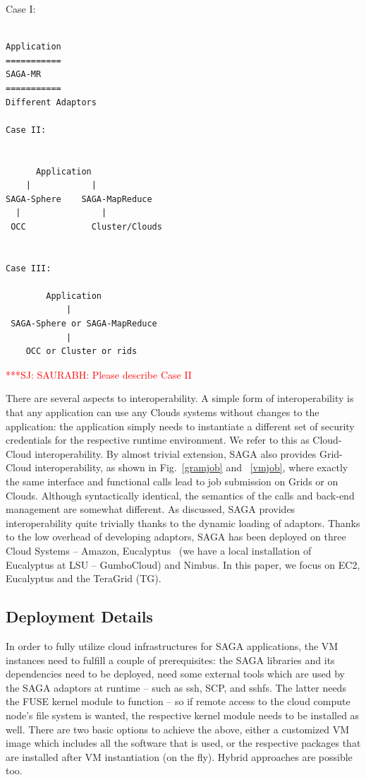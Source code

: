 \documentclass[conference,final]{IEEEtran}
\newcommand{\jhanote}[1]{ {\textcolor{red} { ***SJ: #1 }}}
\newcommand{\jhanote}[1]{}
\newcommand{\upup}{\vspace*{-0.6em}}
\begin{document}
Case I: 

\begin{verbatim}

Application 
===========
SAGA-MR
===========
Different Adaptors

Case II:


      Application
    |            |
SAGA-Sphere    SAGA-MapReduce
  |                |
 OCC             Cluster/Clouds


Case III:

        Application
            |           
 SAGA-Sphere or SAGA-MapReduce
            |
    OCC or Cluster or rids

\end{verbatim}

\jhanote{SAURABH: Please describe Case II}


There are several aspects to interoperability. A simple form of
interoperability is that any application can use any Clouds systems
without changes to the application: the application simply needs to
instantiate a different set of security credentials for the respective
runtime environment. We refer to this as Cloud-Cloud
interoperability. By almost trivial extension, SAGA also provides
Grid-Cloud interoperability, as shown in Fig.~\ref{gramjob} and
~\ref{vmjob}, where exactly the same interface and functional calls
lead to job submission on Grids or on Clouds. Although syntactically
identical, the semantics of the calls and back-end management are
somewhat different.  As discussed, SAGA provides interoperability
quite trivially thanks to the dynamic loading of adaptors.  Thanks to
the low overhead of developing adaptors, SAGA has been deployed on
three Cloud Systems -- Amazon, Eucalyptus~\cite{eucalyptus} (we have a
local installation of Eucalyptus at LSU -- GumboCloud) and
Nimbus.  In this paper, we focus on EC2, Eucalyptus and the TeraGrid
(TG).

\upup
\subsection{Deployment Details}

In order to fully utilize cloud infrastructures for SAGA applications,
the VM instances need to fulfill a couple of prerequisites: the SAGA
libraries and its dependencies need to be deployed, need some external
tools which are used by the SAGA adaptors at runtime -- such as ssh,
SCP, and sshfs.  The latter needs the FUSE kernel module to function
-- so if remote access to the cloud compute node's file system is
wanted, the respective kernel module needs to be installed as well.
There are two basic options to achieve the above, either a customized
VM image which includes all the software that is used, or the
respective packages that are installed after VM instantiation (on the
fly).  Hybrid approaches are possible too.
\end{document}
